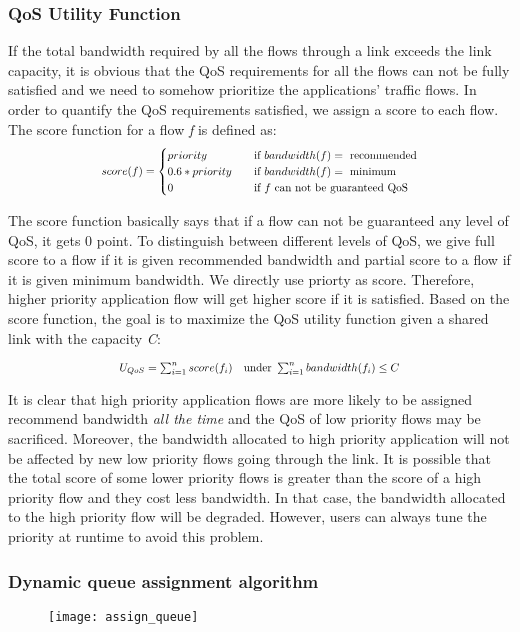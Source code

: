 \subsubsection{QoS Utility Function}
\label{sect:qosUF}
If the total bandwidth required by all the flows through a link exceeds the link capacity, it is obvious that the QoS requirements for
all the flows can not be fully satisfied and we need to somehow prioritize the applications' traffic flows. In order to quantify the QoS
requirements satisfied, we assign a score to each flow. The score function for a flow \emph{f} is defined as:
\begin{equation}
\scalebox{0.8}{
  $score(f) =
    \begin{cases}
      priority       & \quad \text{if } bandwidth(f) = \text{ recommended}\\
      0.6 * priority & \quad \text{if } bandwidth(f) = \text{ minimum}\\
      0              & \quad \text{if } f \text{ can not be guaranteed QoS}\\
    \end{cases}$
}
\end{equation}

The score function basically says that if a flow can not be guaranteed any level of QoS, it gets 0 point. To distinguish between different
levels of QoS, we give full score to a flow if it is given recommended bandwidth and partial score to a flow if it is given minimum bandwidth.
We directly use priorty as score. Therefore, higher priority application flow will get higher score if it is satisfied. Based on the score
function, the goal is to maximize the QoS utility function given a shared link with the capacity \emph{C}:

\begin{equation}
\scalebox{0.8}{
  $ U_{QoS} = \sum_{i=1}^{n} score(f_i) \quad \text{under } \sum_{i=1}^{n} bandwidth(f_i) \leq C $
}
\end{equation}

It is clear that high priority application flows are more likely to be assigned recommend bandwidth \emph{all the time} and the QoS of low
priority flows may be sacrificed. Moreover, the bandwidth allocated to high priority application will not be affected by new low priority flows
going through the link. It is possible that the total score of some lower priority flows is greater than the score of a high priority flow and
they cost less bandwidth. In that case, the bandwidth allocated to the high priority flow will be degraded. However, users can always tune the
priority at runtime to avoid this problem.

\subsubsection{Dynamic queue assignment algorithm}
\label{sect:queueAssignAlgo}
\begin{figure}[htb]
\centering
\texttt{[image: assign\_queue]}
\caption{}
\label{fig:assign_queue}
\end{figure}
